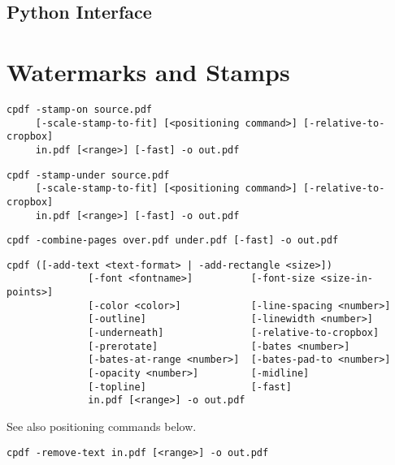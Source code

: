\documentclass{book}
\begin{document}
\begin{pycpdflib}
\clearpage
\section*{Python Interface}
\begin{small}\tt

\end{small}
\end{pycpdflib}

\chapter{Watermarks and Stamps}\label{chap:8}
\label{stamps}
  \begin{framed}
  \noindent\small\verb!cpdf -stamp-on source.pdf!\\
  \noindent\small\verb!     [-scale-stamp-to-fit] [<positioning command>] [-relative-to-cropbox] !\\
  \noindent\small\verb!     in.pdf [<range>] [-fast] -o out.pdf!
  
  \vspace{1.5mm}
  \noindent\small\verb!cpdf -stamp-under source.pdf!\\
  \noindent\small\verb!     [-scale-stamp-to-fit] [<positioning command>] [-relative-to-cropbox]!\\
  \noindent\small\verb!     in.pdf [<range>] [-fast] -o out.pdf!

  \vspace{1.5mm}
  \noindent\small\verb!cpdf -combine-pages over.pdf under.pdf [-fast] -o out.pdf!

  \vspace{1.5mm}
  \noindent\small\begin{verbatim}cpdf ([-add-text <text-format> | -add-rectangle <size>])
              [-font <fontname>]          [-font-size <size-in-points>]
              [-color <color>]            [-line-spacing <number>]
              [-outline]                  [-linewidth <number>]
              [-underneath]               [-relative-to-cropbox]
              [-prerotate]                [-bates <number>]
              [-bates-at-range <number>]  [-bates-pad-to <number>]
              [-opacity <number>]         [-midline]
              [-topline]                  [-fast]
              in.pdf [<range>] -o out.pdf\end{verbatim}
  \noindent See also positioning commands below.

  \vspace{1.5mm}
  \noindent\small\verb!cpdf -remove-text in.pdf [<range>] -o out.pdf!


\end{framed}
\end{document}
